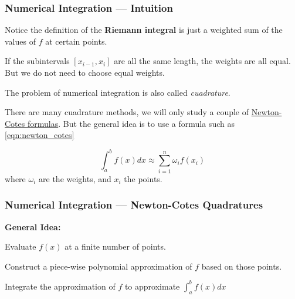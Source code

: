 \documentclass[11pt,xcolor={svgnames},aspectratio=169,usepdftitle=false]{beamer}
\let\toneitemize\itemize
\let\ttwoitemize\enditemize
\renewenvironment{itemize}{\toneitemize\addtolength{\itemsep}{0.7\baselineskip}}{\ttwoitemize}
\begin{document}
\begin{frame}
  \frametitle{Numerical Integration --- Intuition}
\begin{itemize}
  \item Notice the definition of the \alert{\textbf{Riemann integral}} is just a weighted sum of the values of $f$ at certain points.
  \item If the subintervals $[x_{i-1},x_i]$ are all the same length, the weights are all equal. But we do not need to choose equal weights.
  \item The problem of numerical integration is also called \textit{cuadrature}.
  \item There are many cuadrature methods, we will only study a couple of \href{https://en.wikipedia.org/wiki/Newton-Cotes_formulas}{Newton-Cotes formulas}. But the general idea is to use a formula such as \eqref{eqn:newton_cotes}
  
  \begin{equation}
  \int^b_a f(x) dx \approx \sum^n_{i=1}\omega_i f(x_i)
  \label{eqn:newton_cotes}
  \end{equation}
  where $\omega_i$ are the weights, and $x_i$ the points.
\end{itemize}
\end{frame}

\begin{frame}
  \frametitle{Numerical Integration --- Newton-Cotes Quadratures}
  \alert{\textbf{General Idea:}}
\begin{itemize}
  \item Evaluate $f(x)$ at a finite number of points.
  \item Construct a piece-wise polynomial approximation of $f$ based on those points.
  \item Integrate the approximation of $f$ to approximate $\int^b_a f(x)dx$
\end{itemize}
\end{frame}
\end{document}
